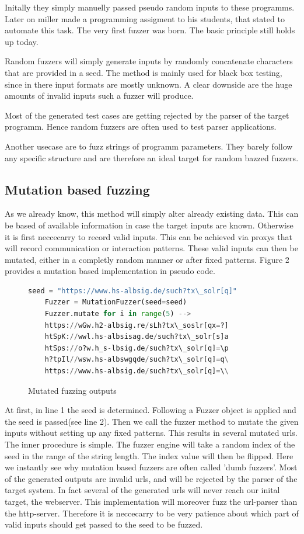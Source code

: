 \documentclass[journal=tosc,final]{iacrtrans}
\begin{document}
Initally they simply manuelly passed pseudo random inputs to these programms. Later on miller made a programming assigment to his students, that stated to automate this task. The very first fuzzer was born. The basic principle still holds up today. 

Random fuzzers will simply generate inputs by randomly concatenate characters that are provided in a seed. The method is mainly used for black box testing, since in there input formats are mostly unknown. A clear downside are the huge amounts of invalid inputs such a fuzzer will produce. 

Most of the generated test cases are getting rejected by the parser of the target programm. Hence random fuzzers are often used to test parser applications.

Another usecase are to fuzz strings of programm parameters. They barely follow any specific structure and are therefore an ideal target for random bazzed fuzzers. 
\subsection{Mutation based fuzzing}
As we already know, this method will simply alter already existing data. This can be based of available information in case the target inputs are known. Otherwise it is first neccecarry to record valid inputs. This can be achieved via proxys that will record communication or interaction patterns. These valid inputs can then be mutated, either in a completly random manner or after fixed patterns. Figure 2 provides a mutation based implementation in pseudo code. 

\begin{figure}[h]
\caption{Mutated fuzzing outputs}
 \begin{lstlisting}[language=python,style=code]
	seed = "https://www.hs-albsig.de/such?tx\_solr[q]"
	Fuzzer = MutationFuzzer(seed=seed)
	Fuzzer.mutate for i in range(5) -->
	https://wGw.h2-albsig.re/sLh?tx\_soslr[qx=?]
	htSpK://wwl.hs-albsisag.de/such?tx\_solr[s]a
	htSps://o?w.h_s-lbsig.de/such?tx\_solr[q]=\p
	h?tpIl//wsw.hs-albswgqde/such?tx\_solr[q]=q\
	https://www.hs-albsig.de/such?tx\_solr[q]=\\
\end{lstlisting}

\end{figure}
At first, in line 1 the seed is determined. Following a Fuzzer object is applied and the seed is passed(see line 2). Then we call the fuzzer method to mutate the given inputs without setting up any fixed patterns. This results in several mutated urls. The inner procedure is simple. The fuzzer engine will take a random index of the seed in the range of the string length. The index value will then be flipped.  Here we instantly see why mutation based fuzzers are often called 'dumb fuzzers'. 
Most of the generated outputs are invalid urls, and will be rejected by the parser of the target system. In fact several of the generated urls will never reach our inital target, the webserver. This implementation will moreover fuzz the url-parser than the http-server.
Therefore it is neccecarry to be very patience about which part of valid inputs should get passed to the seed to be fuzzed. 
\end{document}
